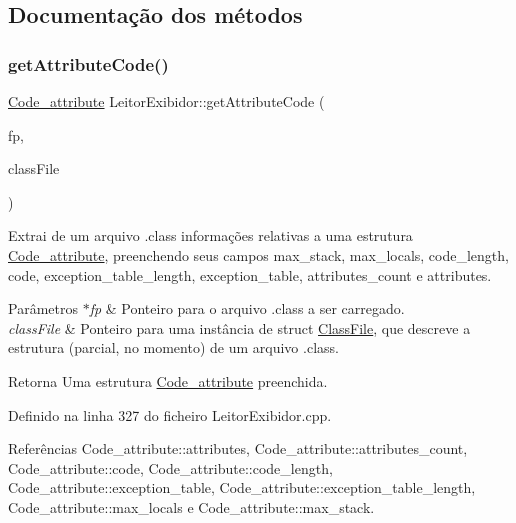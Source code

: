 \subsection{Documentação dos métodos}
\mbox{\label{classLeitorExibidor_a3ebd90beea3ea327aa7d22b84357c4d0}} 
\subsubsection{\texorpdfstring{get\+Attribute\+Code()}{getAttributeCode()}}
{\footnotesize\ttfamily \hyperlink{structCode__attribute}{Code\+\_\+attribute} Leitor\+Exibidor\+::get\+Attribute\+Code (\begin{DoxyParamCaption}\item[{F\+I\+LE $\ast$}]{fp,  }\item[{\hyperlink{classClassFile}{Class\+File} $\ast$}]{class\+File }\end{DoxyParamCaption})\hspace{0.3cm}{\ttfamily [private]}}

Extrai de um arquivo .class informações relativas a uma estrutura \hyperlink{structCode__attribute}{Code\+\_\+attribute}, preenchendo seus campos max\+\_\+stack, max\+\_\+locals, code\+\_\+length, code, exception\+\_\+table\+\_\+length, exception\+\_\+table, attributes\+\_\+count e attributes. 
\begin{DoxyParams}{Parâmetros}
{\em $\ast$fp} & Ponteiro para o arquivo .class a ser carregado. \\
\hline
{\em class\+File} & Ponteiro para uma instância de struct \hyperlink{classClassFile}{Class\+File}, que descreve a estrutura (parcial, no momento) de um arquivo .class. \\
\hline
\end{DoxyParams}
\begin{DoxyReturn}{Retorna}
Uma estrutura \hyperlink{structCode__attribute}{Code\+\_\+attribute} preenchida. 
\end{DoxyReturn}


Definido na linha 327 do ficheiro Leitor\+Exibidor.\+cpp.



Referências Code\+\_\+attribute\+::attributes, Code\+\_\+attribute\+::attributes\+\_\+count, Code\+\_\+attribute\+::code, Code\+\_\+attribute\+::code\+\_\+length, Code\+\_\+attribute\+::exception\+\_\+table, Code\+\_\+attribute\+::exception\+\_\+table\+\_\+length, Code\+\_\+attribute\+::max\+\_\+locals e Code\+\_\+attribute\+::max\+\_\+stack.

